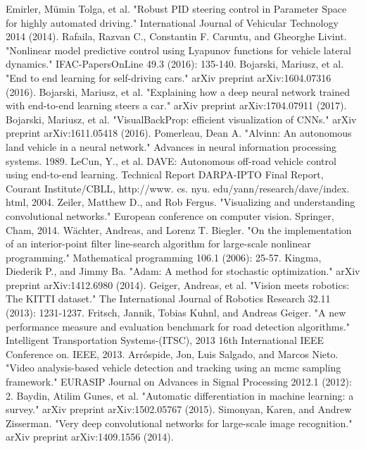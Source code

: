 \documentclass[12pt,a4paper,oneside]{book}
\begin{document}
\pagebreak
\begin{thebibliography}{00}
 Emirler, Mümin Tolga, et al. "Robust PID steering control in Parameter Space for highly automated driving." International Journal of Vehicular Technology 2014 (2014).
 Rafaila, Razvan C., Constantin F. Caruntu, and Gheorghe Livint. "Nonlinear model predictive control using Lyapunov functions for vehicle lateral dynamics." IFAC-PapersOnLine 49.3 (2016): 135-140.
 Bojarski, Mariusz, et al. "End to end learning for self-driving cars." arXiv preprint arXiv:1604.07316 (2016).
 Bojarski, Mariusz, et al. "Explaining how a deep neural network trained with end-to-end learning steers a car." arXiv preprint arXiv:1704.07911 (2017).
 Bojarski, Mariusz, et al. "VisualBackProp: efficient visualization of CNNs." arXiv preprint arXiv:1611.05418 (2016).
 Pomerleau, Dean A. "Alvinn: An autonomous land vehicle in a neural network." Advances in neural information processing systems. 1989.
 LeCun, Y., et al. DAVE: Autonomous off-road vehicle control using end-to-end learning. Technical Report DARPA-IPTO Final Report, Courant Institute/CBLL, http://www. cs. nyu. edu/yann/research/dave/index. html, 2004.
 Zeiler, Matthew D., and Rob Fergus. "Visualizing and understanding convolutional networks." European conference on computer vision. Springer, Cham, 2014.
 Wächter, Andreas, and Lorenz T. Biegler. "On the implementation of an interior-point filter line-search algorithm for large-scale nonlinear programming." Mathematical programming 106.1 (2006): 25-57.
 Kingma, Diederik P., and Jimmy Ba. "Adam: A method for stochastic optimization." arXiv preprint arXiv:1412.6980 (2014).
 Geiger, Andreas, et al. "Vision meets robotics: The KITTI dataset." The International Journal of Robotics Research 32.11 (2013): 1231-1237.
 Fritsch, Jannik, Tobias Kuhnl, and Andreas Geiger. "A new performance measure and evaluation benchmark for road detection algorithms." Intelligent Transportation Systems-(ITSC), 2013 16th International IEEE Conference on. IEEE, 2013.
 Arróspide, Jon, Luis Salgado, and Marcos Nieto. "Video analysis-based vehicle detection and tracking using an mcmc sampling framework." EURASIP Journal on Advances in Signal Processing 2012.1 (2012): 2.
 Baydin, Atilim Gunes, et al. "Automatic differentiation in machine learning: a survey." arXiv preprint arXiv:1502.05767 (2015).
 Simonyan, Karen, and Andrew Zisserman. "Very deep convolutional networks for large-scale image recognition." arXiv preprint arXiv:1409.1556 (2014).
\end{thebibliography}
\end{document}
